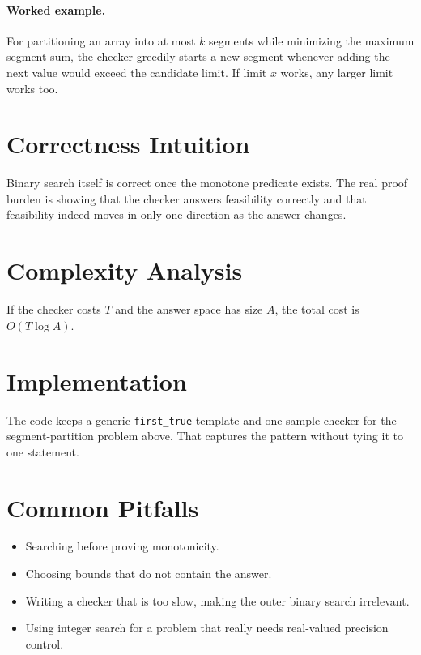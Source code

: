 \paragraph{Worked example.}
For partitioning an array into at most \(k\) segments while minimizing the maximum segment sum, the checker greedily
starts a new segment whenever adding the next value would exceed the candidate limit. If limit \(x\) works, any larger
limit works too.

\section*{Correctness Intuition}

Binary search itself is correct once the monotone predicate exists. The real proof burden is showing that the checker
answers feasibility correctly and that feasibility indeed moves in only one direction as the answer changes.

\section*{Complexity Analysis}

If the checker costs \(T\) and the answer space has size \(A\), the total cost is \(O(T \log A)\).

\section*{Implementation}

The code keeps a generic \texttt{first\_true} template and one sample checker for the segment-partition problem above.
That captures the pattern without tying it to one statement.

\section*{Common Pitfalls}

\begin{itemize}
  \item Searching before proving monotonicity.
  \item Choosing bounds that do not contain the answer.
  \item Writing a checker that is too slow, making the outer binary search irrelevant.
  \item Using integer search for a problem that really needs real-valued precision control.
\end{itemize}


